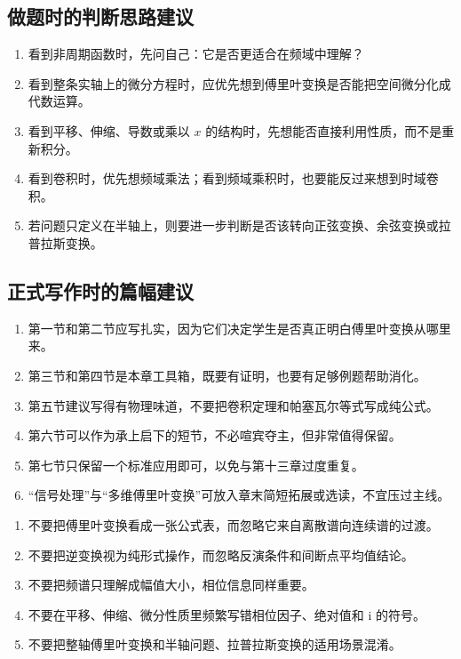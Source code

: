 \subsection*{做题时的判断思路建议}
\begin{tishi}[做题时的判断思路]
\begin{enumerate}
    \item 看到非周期函数时，先问自己：它是否更适合在频域中理解？
    \item 看到整条实轴上的微分方程时，应优先想到傅里叶变换是否能把空间微分化成代数运算。
    \item 看到平移、伸缩、导数或乘以 $x$ 的结构时，先想能否直接利用性质，而不是重新积分。
    \item 看到卷积时，优先想频域乘法；看到频域乘积时，也要能反过来想到时域卷积。
    \item 若问题只定义在半轴上，则要进一步判断是否该转向正弦变换、余弦变换或拉普拉斯变换。
\end{enumerate}
\end{tishi}

\subsection*{正式写作时的篇幅建议}
\begin{tishi}[正式写作时的篇幅建议]
\begin{enumerate}
    \item 第一节和第二节应写扎实，因为它们决定学生是否真正明白傅里叶变换从哪里来。
    \item 第三节和第四节是本章工具箱，既要有证明，也要有足够例题帮助消化。
    \item 第五节建议写得有物理味道，不要把卷积定理和帕塞瓦尔等式写成纯公式。
    \item 第六节可以作为承上启下的短节，不必喧宾夺主，但非常值得保留。
    \item 第七节只保留一个标准应用即可，以免与第十三章过度重复。
    \item ``信号处理''与``多维傅里叶变换''可放入章末简短拓展或选读，不宜压过主线。
\end{enumerate}
\end{tishi}

\begin{jinshi}[本章最容易混淆的地方]
\begin{enumerate}
    \item 不要把傅里叶变换看成一张公式表，而忽略它来自离散谱向连续谱的过渡。
    \item 不要把逆变换视为纯形式操作，而忽略反演条件和间断点平均值结论。
    \item 不要把频谱只理解成幅值大小，相位信息同样重要。
    \item 不要在平移、伸缩、微分性质里频繁写错相位因子、绝对值和 $\mathrm{i}$ 的符号。
    \item 不要把整轴傅里叶变换和半轴问题、拉普拉斯变换的适用场景混淆。
\end{enumerate}
\end{jinshi}

